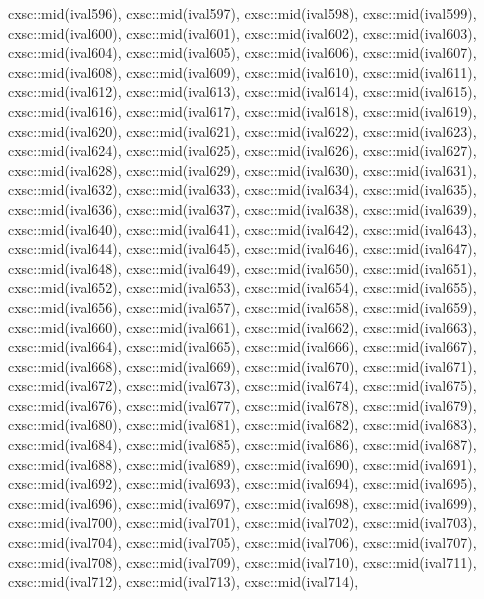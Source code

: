 \begin{DoxyCode}
{  cxsc::mid(ival596),
  cxsc::mid(ival597),
  cxsc::mid(ival598),
  cxsc::mid(ival599),
  cxsc::mid(ival600),
  cxsc::mid(ival601),
  cxsc::mid(ival602),
  cxsc::mid(ival603),
  cxsc::mid(ival604),
  cxsc::mid(ival605),
  cxsc::mid(ival606),
  cxsc::mid(ival607),
  cxsc::mid(ival608),
  cxsc::mid(ival609),
  cxsc::mid(ival610),
  cxsc::mid(ival611),
  cxsc::mid(ival612),
  cxsc::mid(ival613),
  cxsc::mid(ival614),
  cxsc::mid(ival615),
  cxsc::mid(ival616),
  cxsc::mid(ival617),
  cxsc::mid(ival618),
  cxsc::mid(ival619),
  cxsc::mid(ival620),
  cxsc::mid(ival621),
  cxsc::mid(ival622),
  cxsc::mid(ival623),
  cxsc::mid(ival624),
  cxsc::mid(ival625),
  cxsc::mid(ival626),
  cxsc::mid(ival627),
  cxsc::mid(ival628),
  cxsc::mid(ival629),
  cxsc::mid(ival630),
  cxsc::mid(ival631),
  cxsc::mid(ival632),
  cxsc::mid(ival633),
  cxsc::mid(ival634),
  cxsc::mid(ival635),
  cxsc::mid(ival636),
  cxsc::mid(ival637),
  cxsc::mid(ival638),
  cxsc::mid(ival639),
  cxsc::mid(ival640),
  cxsc::mid(ival641),
  cxsc::mid(ival642),
  cxsc::mid(ival643),
  cxsc::mid(ival644),
  cxsc::mid(ival645),
  cxsc::mid(ival646),
  cxsc::mid(ival647),
  cxsc::mid(ival648),
  cxsc::mid(ival649),
  cxsc::mid(ival650),
  cxsc::mid(ival651),
  cxsc::mid(ival652),
  cxsc::mid(ival653),
  cxsc::mid(ival654),
  cxsc::mid(ival655),
  cxsc::mid(ival656),
  cxsc::mid(ival657),
  cxsc::mid(ival658),
  cxsc::mid(ival659),
  cxsc::mid(ival660),
  cxsc::mid(ival661),
  cxsc::mid(ival662),
  cxsc::mid(ival663),
  cxsc::mid(ival664),
  cxsc::mid(ival665),
  cxsc::mid(ival666),
  cxsc::mid(ival667),
  cxsc::mid(ival668),
  cxsc::mid(ival669),
  cxsc::mid(ival670),
  cxsc::mid(ival671),
  cxsc::mid(ival672),
  cxsc::mid(ival673),
  cxsc::mid(ival674),
  cxsc::mid(ival675),
  cxsc::mid(ival676),
  cxsc::mid(ival677),
  cxsc::mid(ival678),
  cxsc::mid(ival679),
  cxsc::mid(ival680),
  cxsc::mid(ival681),
  cxsc::mid(ival682),
  cxsc::mid(ival683),
  cxsc::mid(ival684),
  cxsc::mid(ival685),
  cxsc::mid(ival686),
  cxsc::mid(ival687),
  cxsc::mid(ival688),
  cxsc::mid(ival689),
  cxsc::mid(ival690),
  cxsc::mid(ival691),
  cxsc::mid(ival692),
  cxsc::mid(ival693),
  cxsc::mid(ival694),
  cxsc::mid(ival695),
  cxsc::mid(ival696),
  cxsc::mid(ival697),
  cxsc::mid(ival698),
  cxsc::mid(ival699),
  cxsc::mid(ival700),
  cxsc::mid(ival701),
  cxsc::mid(ival702),
  cxsc::mid(ival703),
  cxsc::mid(ival704),
  cxsc::mid(ival705),
  cxsc::mid(ival706),
  cxsc::mid(ival707),
  cxsc::mid(ival708),
  cxsc::mid(ival709),
  cxsc::mid(ival710),
  cxsc::mid(ival711),
  cxsc::mid(ival712),
  cxsc::mid(ival713),
  cxsc::mid(ival714),
}
\end{DoxyCode}
